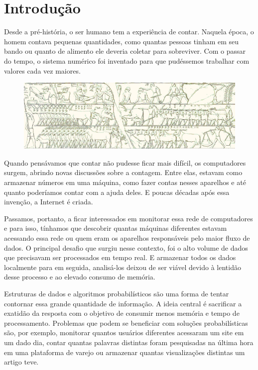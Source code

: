 \chapter{Introdução}
\label{chap:introducao}

Desde a pré-história, o ser humano tem a experiência de contar. Naquela época, o homem contava pequenas quantidades, 
como quantas pessoas tinham em seu bando ou quanto de alimento ele deveria coletar para sobreviver. Com o passar do 
tempo, o sistema numérico foi inventado para que pudéssemos trabalhar com valores cada vez maiores. 

\vspace{4mm}
\begin{figure}
  \centering
  \includegraphics[width=\linewidth]{figuras/ancient_counting.png}
\end{figure} 
\vspace{2mm}

Quando pensávamos que contar não pudesse ficar mais difícil, os computadores surgem, abrindo novas discussões sobre a 
contagem. Entre elas, estavam como armazenar números em uma máquina, como fazer contas nesses aparelhos e até quanto 
poderíamos contar com a ajuda deles. E poucas décadas após essa invenção, a Internet é criada. 

Passamos, portanto, a ficar interessados em monitorar essa rede de computadores e para isso, tínhamos que descobrir 
quantas máquinas diferentes estavam acessando essa rede ou quem eram os aparelhos responsáveis pelo maior fluxo de dados. 
O principal desafio que surgiu nesse contexto, foi o alto volume de dados que precisavam ser processados em tempo real. 
E armazenar todos os dados localmente para em seguida, analisá-los deixou de ser viável devido à lentidão desse processo 
e ao elevado consumo de memória.

Estruturas de dados e algoritmos probabilísticos são uma forma de tentar contornar essa grande quantidade de informação. 
A ideia central é sacrificar a exatidão da resposta com o objetivo de consumir menos memória e tempo de processamento. 
Problemas que podem se beneficiar com soluções probabilísticas são, por exemplo, monitorar quantos usuários diferentes 
acessaram um site em um dado dia, contar quantas palavras distintas foram pesquisadas na última hora em uma plataforma 
de varejo ou armazenar quantas visualizações distintas um artigo teve. 

